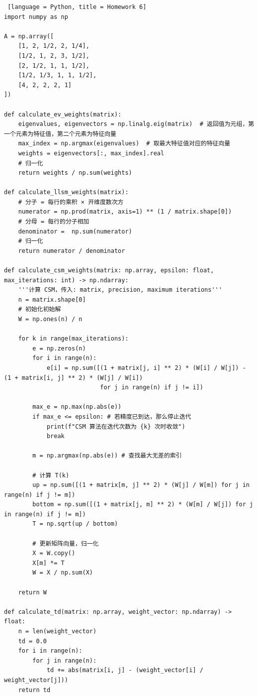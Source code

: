\documentclass[14pt,a4paper,UTF8,twoside]{article}
\begin{document}
\begin{lstlisting} [language = Python, title = Homework 6]
import numpy as np

A = np.array([
    [1, 2, 1/2, 2, 1/4],
    [1/2, 1, 2, 3, 1/2],
    [2, 1/2, 1, 1, 1/2],
    [1/2, 1/3, 1, 1, 1/2],
    [4, 2, 2, 2, 1]
])

def calculate_ev_weights(matrix):
    eigenvalues, eigenvectors = np.linalg.eig(matrix)  # 返回值为元组，第一个元素为特征值，第二个元素为特征向量
    max_index = np.argmax(eigenvalues)  # 取最大特征值对应的特征向量
    weights = eigenvectors[:, max_index].real
    # 归一化
    return weights / np.sum(weights)

def calculate_llsm_weights(matrix):
    # 分子 = 每行的乘积 × 开维度数次方
    numerator = np.prod(matrix, axis=1) ** (1 / matrix.shape[0])
    # 分母 = 每行的分子相加
    denominator =  np.sum(numerator)
    # 归一化
    return numerator / denominator

def calculate_csm_weights(matrix: np.array, epsilon: float, max_iterations: int) -> np.ndarray:
    '''计算 CSM，传入: matrix, precision, maximum iterations'''
    n = matrix.shape[0]
    # 初始化初始解
    W = np.ones(n) / n

    for k in range(max_iterations):
        e = np.zeros(n)
        for i in range(n):
            e[i] = np.sum([(1 + matrix[j, i] ** 2) * (W[i] / W[j]) - (1 + matrix[i, j] ** 2) * (W[j] / W[i])
                           for j in range(n) if j != i])

        max_e = np.max(np.abs(e))
        if max_e <= epsilon: # 若精度已到达，那么停止迭代
            print(f"CSM 算法在迭代次数为 {k} 次时收敛")
            break

        m = np.argmax(np.abs(e)) # 查找最大无差的索引

        # 计算 T(k)
        up = np.sum([(1 + matrix[m, j] ** 2) * (W[j] / W[m]) for j in range(n) if j != m])
        bottom = np.sum([(1 + matrix[j, m] ** 2) * (W[m] / W[j]) for j in range(n) if j != m])
        T = np.sqrt(up / bottom)

        # 更新矩阵向量，归一化
        X = W.copy()
        X[m] *= T
        W = X / np.sum(X)

    return W

def calculate_td(matrix: np.array, weight_vector: np.ndarray) -> float:
    n = len(weight_vector)
    td = 0.0
    for i in range(n):
        for j in range(n):
            td += abs(matrix[i, j] - (weight_vector[i] / weight_vector[j]))
    return td


\end{lstlisting}
\end{document}
